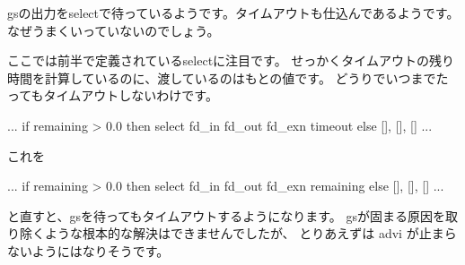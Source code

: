 \documentclass[mingoth,a4paper]{jsarticle}
\begin{document}
gsの出力をselectで待っているようです。タイムアウトも仕込んであるようです。
なぜうまくいっていないのでしょう。

ここでは前半で定義されているselectに注目です。
せっかくタイムアウトの残り時間を計算しているのに、渡しているのはもとの値です。
どうりでいつまでたってもタイムアウトしないわけです。

\begin{commandline}
...
if remaining > 0.0 then select fd_in fd_out fd_exn timeout else [], [], []
...
\end{commandline}

これを
\begin{commandline}
...
if remaining > 0.0 then select fd_in fd_out fd_exn remaining else [], [], []
...
\end{commandline}

と直すと、gsを待ってもタイムアウトするようになります。
gsが固まる原因を取り除くような根本的な解決はできませんでしたが、
とりあえずは advi が止まらないようにはなりそうです。

\end{document}
